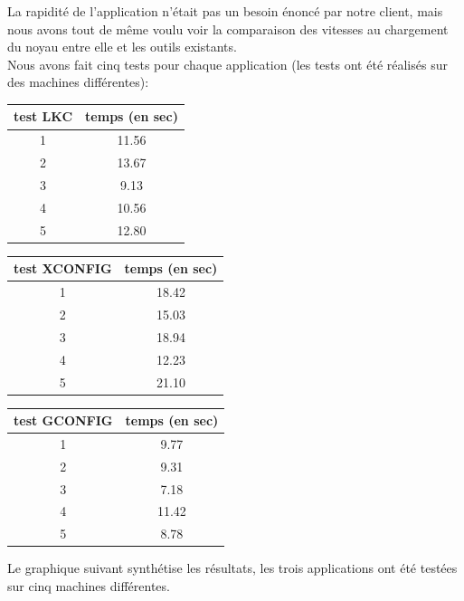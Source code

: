 \documentclass[17pts]{report}
\begin{document}
La rapidité de l'application n'était pas un besoin énoncé par notre client,
mais nous avons tout de même voulu voir la comparaison des vitesses au
chargement du noyau entre elle et les outils existants.\\

Nous avons fait cinq tests pour chaque application (les tests ont été réalisés
sur des machines différentes):

\begin{tabular}{|c|c|}
\hline
test LKC & temps (en sec) \\
\hline
\hline
1 & 11.56 \\
\hline
2 & 13.67 \\
\hline
3 & 9.13 \\
\hline
4 & 10.56 \\
\hline
5 & 12.80 \\
\hline
\end{tabular}
\newline
\newline

\begin{tabular}{|c|c|}
\hline
test XCONFIG & temps (en sec) \\
\hline
\hline
1 & 18.42 \\
\hline
2 & 15.03 \\
\hline
3 & 18.94 \\
\hline
4 & 12.23 \\
\hline
5 & 21.10 \\
\hline
\end{tabular}
\newline
\newline

\begin{tabular}{|c|c|}
\hline
test GCONFIG & temps (en sec) \\
\hline
\hline
1 & 9.77 \\
\hline
2 & 9.31 \\
\hline
3 & 7.18 \\
\hline
4 & 11.42 \\
\hline
5 & 8.78 \\
\hline
\end{tabular}
\newline
\newline

Le graphique suivant synthétise les résultats, les trois applications ont été
testées sur cinq machines différentes.
\end{document}
